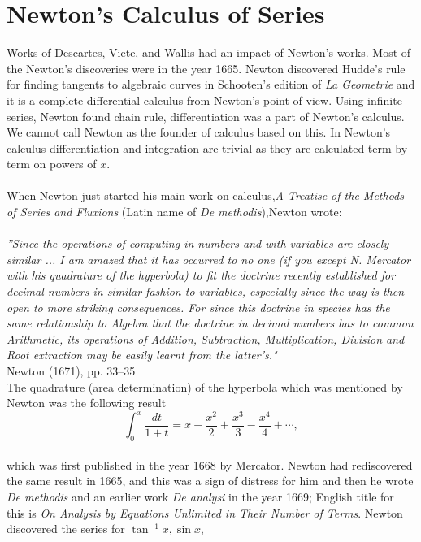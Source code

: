 \documentclass[a4paper,reqno,11pt]{book}
\theoremstyle{plain}%
\theoremstyle{definition}
\begin{document}
\section{Newton’s Calculus of Series}
Works of Descartes, Viete, and Wallis had an impact of Newton's works. Most of the Newton's discoveries were in the year 1665. Newton discovered Hudde's rule for finding tangents to algebraic curves in Schooten’s edition
of \textit{La Geometrie} and it is a complete differential calculus from Newton’s point of view. Using infinite series, Newton found chain rule, differentiation was a part of Newton's calculus. We cannot call Newton as the founder of calculus based on this. In Newton's calculus differentiation and integration are trivial as they are calculated term by term on powers of $x$.\\
\\
\indent When Newton just started his main work on calculus,\textit{A Treatise of the Methods of Series and Fluxions} (Latin name of \textit{De methodis}),Newton wrote:\\
\\
\textit{''Since the operations of computing in numbers and with variables are closely similar ... I am amazed that it has occurred
to no one (if you except N. Mercator with his quadrature of
the hyperbola) to fit the doctrine recently established for decimal numbers in similar fashion to variables, especially since
the way is then open to more striking consequences. For since
this doctrine in species has the same relationship to Algebra
that the doctrine in decimal numbers has to common Arithmetic, its operations of Addition, Subtraction, Multiplication,
Division and Root extraction may be easily learnt from the
latter’s."}\cite{ref 5}\\
\vspace{2ex}
\hfill{Newton (1671), pp. 33–35}\\
The quadrature (area determination) of the hyperbola which was mentioned by
Newton was the following result\\
$$\int_{0}^{x} \frac{dt}{1+t} = x - \frac{x^2}{2} + \frac{x^3}{3} - \frac{x^4}{4} + \cdots,$$
\\
which was first published in the year 1668 by Mercator. Newton had rediscovered the same result
in 1665, and this was a sign of distress for him and then he wrote \textit{De methodis} and an earlier work \textit{De analysi} in the year 1669; English title for this is \textit{On Analysis by Equations Unlimited in Their Number of
Terms}. Newton discovered the series for $\tan^{-1}x, \sin x,$
\end{document}
